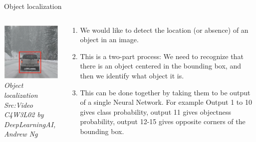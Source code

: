 \begin{frame}{Object localization}
	\begin{columns}[T]
        \begin{column}{0.4\textwidth}
        	\includegraphics[width=\textwidth]{images/loca.png}
			\tiny{\textit{Object localization\\Src:Video C4W3L02 by DeepLearningAI, Andrew Ng}}
        \end{column}
		\begin{column}{0.6\textwidth}
			\begin{enumerate}[$\bullet$]
				\item We would like to detect the location (or absence) of an object in an image.\pause
				\item This is a two-part process: We need to recognize that there is an object centered in the bounding box, and then we identify what object it is. \pause
				\item This can be done together by taking them to be output of a single Neural Network. For example Output 1 to 10 gives class probability, output 11 gives objectness probability, output 12-15 gives opposite corners of the bounding box.
			\end{enumerate}
		\end{column} 
    \end{columns}
\end{frame}
